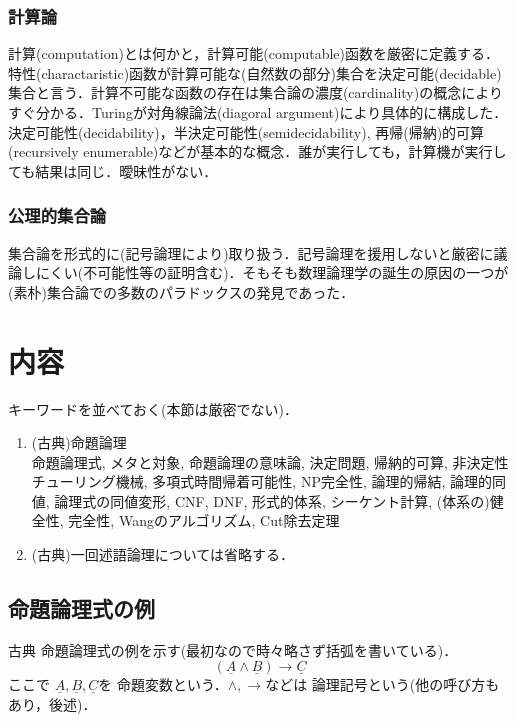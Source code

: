 \documentclass{ltjsarticle}
\theoremstyle{mystyle1}
\theoremstyle{mystyle3}
\theoremstyle{mystyle2}
\newcommand{\uA}{\underline{A}}
\newcommand{\uB}{\underline{B}}
\newcommand{\uC}{\underline{C}}
\newcommand{\red}[1]{{\color{red} #1}}
\begin{document}
\subsubsection{計算論}
計算(computation)とは何かと，計算可能(computable)函数を厳密に定義する．特性(charactaristic)函数が計算可能な(自然数の部分)集合を決定可能(decidable)集合と言う．計算不可能な函数の存在は集合論の濃度(cardinality)の概念によりすぐ分かる．Turingが対角線論法(diagoral argument)により具体的に構成した．決定可能性(decidability)，半決定可能性(semidecidability), 再帰(帰納)的可算(recursively enumerable)などが基本的な概念．誰が実行しても，計算機が実行しても結果は同じ．曖昧性がない．
\subsubsection{公理的集合論}
集合論を形式的に(記号論理により)取り扱う．記号論理を援用しないと厳密に議論しにくい(不可能性等の証明含む)．そもそも数理論理学の誕生の原因の一つが(素朴)集合論での多数のパラドックスの発見であった．

\section{内容}
キーワードを並べておく(本節は厳密でない)．
\begin{enumerate}
  \item (古典)命題論理\\命題論理式, メタと対象, 命題論理の意味論, 決定問題, 帰納的可算, 非決定性チューリング機械, 多項式時間帰着可能性, NP完全性, 論理的帰結, 論理的同値, 論理式の同値変形, CNF, DNF, 形式的体系, シーケント計算, (体系の)健全性, 完全性, Wangのアルゴリズム, Cut除去定理
  \item (古典)一回述語論理については省略する．
\end{enumerate}

\subsection{命題論理式の例}
古典\red{命題論理式}の例を示す(最初なので時々略さず括弧を書いている)．
\[\left(\uA\wedge\uB\right)\to\uC\]
ここで $\uA,\uB,\uC$を\red{命題変数}という．$\wedge,\to$などは\red{論理記号}という(他の呼び方もあり，後述)．
\end{document}
